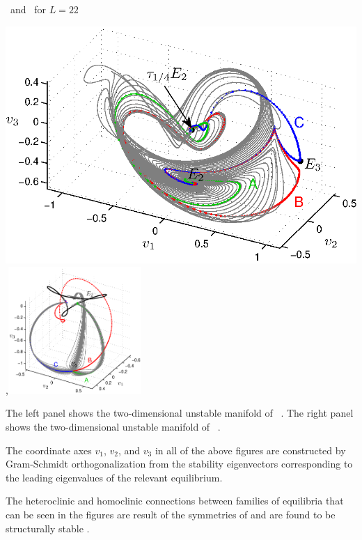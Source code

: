 \documentclass{theo1poster}[2003/04/25]
\begin{document}
\begin{poster}{3}
\begin{sheet}{\Eqva\ and \reqva\ for $L=22$}
\centerline{\includegraphics[width=.48\textwidth]{../../figs/ks22_E2_manifold_c.eps},\includegraphics[width=0.38\textwidth]{../../figs/ks22_E3_manifold.eps}}
The left panel shows the two-dimensional
unstable manifold of \eqv\ . 
 The right panel shows the two-dimensional
unstable manifold of \eqv\ . 

The coordinate axes
$v_1$, $v_2$, and $v_3$ in all of the above figures are constructed by Gram-Schmidt orthogonalization from 
the stability eigenvectors corresponding to
the leading eigenvalues of the relevant equilibrium. 

The heteroclinic and homoclinic connections
between families of equilibria that can be seen in the figures are result of the symmetries of \KSe and are 
found to be structurally stable . 

\end{sheet}


\end{poster}
\end{document}
